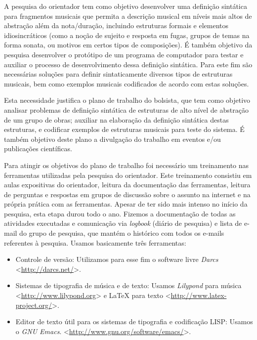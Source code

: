 \documentclass[11pt]{article}
\newcommand{\eng}[1]{\textit{#1}}
\begin{document}
A pesquisa do orientador tem como objetivo desenvolver uma definição
sintática para fragmentos musicais que permita a descrição musical em
níveis mais altos de abstração além da nota/duração, incluindo
estruturas formais e elementos idiosincráticos (como a noção de
sujeito e resposta em fugas, grupos de temas na forma sonata, ou
motivos em certos tipos de composições). É também objetivo da pesquisa
desenvolver o protótipo de um programa de computador para testar e
auxiliar o processo de desenvolvimento dessa definição sintática. Para
este fim são necessárias soluções para definir sintaticamente diversos
tipos de estruturas musicais, bem como exemplos musicais codificados
de acordo com estas soluções.

Esta necessidade justifica o plano de trabalho do bolsista, que tem
como objetivo analisar problemas de definição sintática de estruturas
de alto nível de abstração de um grupo de obras; auxiliar na
elaboração da definição sintática destas estruturas, e codificar
exemplos de estruturas musicais para teste do sistema. É também
objetivo deste plano a divulgação do trabalho em eventos e/ou
publicações científicas.


Para atingir os objetivos do plano de trabalho foi necessário um
treinamento nas ferramentas utilizadas pela pesquisa do orientador.
Este treinamento consistiu em aulas expositivas do orientador, leitura
da documentação das ferramentas, leitura de perguntas e respostas em
grupos de discussão sobre o assunto na internet e na própria prática
com as ferramentas. Apesar de ter sido mais intenso no início da
pesquisa, esta etapa durou todo o ano. Fizemos a documentação de todas
as atividades executadas e comunicação via \eng {logbook} (diário de
pesquisa) e lista de e-mail do grupo de pesquisa, que mantém o
histórico com todos os e-mails referentes à pesquisa. Usamos
basicamente três ferramentas:
\begin{itemize}
\item Controle de versão: Utilizamos para esse fim o software livre
  \eng {Darcs} <\url{http://darcs.net/}>.
\item Sistemas de tipografia de música e de texto: Usamos
  \eng{Lilypond} para música <\url{http://www.lilypond.org}> e \LaTeX
  para texto <\url{http://www.latex-project.org/}>.
\item Editor de texto útil para os sistemas de tipografia e
  codificação LISP: Usamos o \eng{GNU Emacs}.
  <\url{http://www.gnu.org/software/emacs/}>.
\end{itemize}
\end{document}
